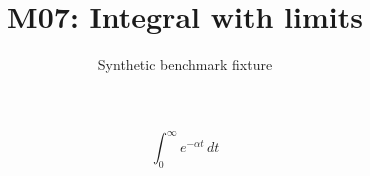 \documentclass{article}
\title{M07: Integral with limits}
\author{Synthetic benchmark fixture}
\date{}
\begin{document}
\maketitle
\[\int_{0}^{\infty}e^{-\alpha t}\,dt\]
\end{document}
